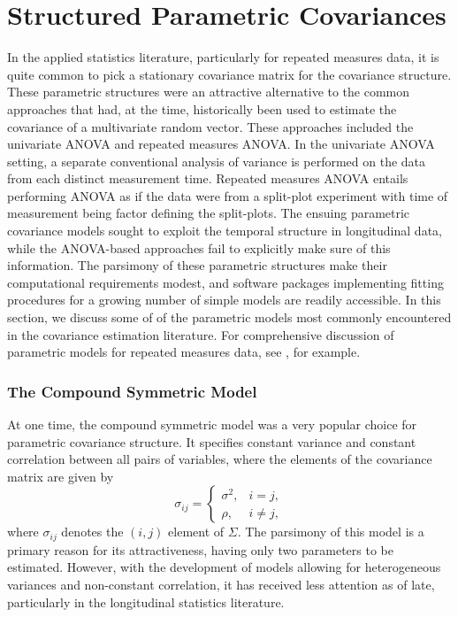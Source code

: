


\section{Structured Parametric Covariances} \label{chapter-1-parametric-covariance-models}


In the applied statistics literature, particularly for repeated measures data, it is quite common to pick a stationary covariance matrix for the covariance structure. These parametric structures were an attractive alternative to the common approaches that had, at the time, historically been used to estimate the covariance of a multivariate random vector. These approaches included the univariate ANOVA and repeated measures ANOVA. In the univariate ANOVA setting, a separate conventional analysis of variance is performed on the data from each distinct measurement time. Repeated measures ANOVA entails performing ANOVA as if the data were from a split-plot experiment with time of measurement being factor defining the split-plots.  The ensuing parametric covariance models sought to exploit the temporal structure in longitudinal data, while the ANOVA-based approaches fail to explicitly make sure of this information. The parsimony of these parametric structures make their computational requirements modest, and software packages implementing fitting procedures for a growing number of simple models are readily accessible. In this section, we discuss some of of the parametric models most commonly encountered in the covariance estimation literature. For comprehensive discussion of parametric models for repeated measures data, see \cite{jennrich1986unbalanced}, for example. 

\subsubsection{The Compound Symmetric Model}

At one time, the compound symmetric model was a very popular choice for parametric covariance structure. It specifies constant variance and constant correlation between all pairs of variables, where the elements of the covariance matrix are given by
\begin{equation}\label{eq:compound-symmetric-model}
\sigma_{ij} = \left\{ \begin{array}{lr}
\sigma^2, & i = j, \\
\rho, & i \ne j,
\end{array}\right.
\end{equation}
\noindent
where $\sigma_{ij}$ denotes the $\left(i,j\right)$ element of $\Sigma$. The parsimony of this model is a primary reason for its attractiveness, having only two parameters to be estimated. However, with the development of models allowing for heterogeneous variances and non-constant correlation, it has received less attention as of late, particularly in the longitudinal statistics literature. 


